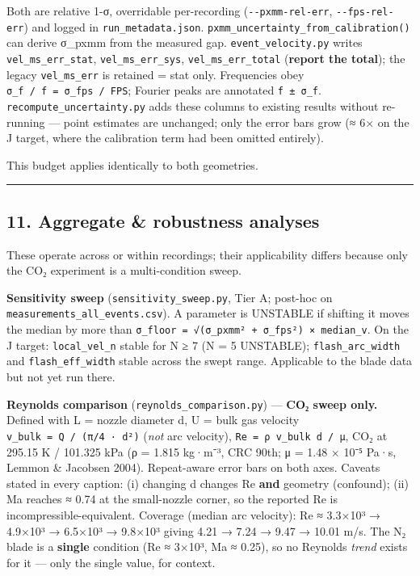 \documentclass[
  11pt,
]{article}
\begin{document}
Both are relative 1-σ, overridable per-recording
(\texttt{-\/-pxmm-rel-err}, \texttt{-\/-fps-rel-err}) and logged in
\texttt{run\_metadata.json}.
\texttt{pxmm\_uncertainty\_from\_calibration()} can derive σ\_pxmm from
the measured gap. \texttt{event\_velocity.py} writes
\texttt{vel\_ms\_err\_stat}, \texttt{vel\_ms\_err\_sys},
\texttt{vel\_ms\_err\_total} (\textbf{report the total}); the legacy
\texttt{vel\_ms\_err} is retained = stat only. Frequencies obey
\texttt{σ\_f\ /\ f\ =\ σ\_fps\ /\ FPS}; Fourier peaks are annotated
\texttt{f\ ±\ σ\_f}. \texttt{recompute\_uncertainty.py} adds these
columns to existing results without re-running --- point estimates are
unchanged; only the error bars grow (≈ 6× on the J target, where the
calibration term had been omitted entirely).

This budget applies identically to both geometries.

\begin{center}\rule{0.5\linewidth}{0.5pt}\end{center}

\hypertarget{11-aggregate--robustness-analyses}{%
\subsection{11. Aggregate \& robustness
analyses}\label{11-aggregate--robustness-analyses}}

These operate across or within recordings; their applicability differs
because only the CO₂ experiment is a multi-condition sweep.

\textbf{Sensitivity sweep} (\texttt{sensitivity\_sweep.py}, Tier A;
post-hoc on \texttt{measurements\_all\_events.csv}). A parameter is
UNSTABLE if shifting it moves the median by more than
\texttt{σ\_floor\ =\ √(σ\_pxmm²\ +\ σ\_fps²)\ ×\ median\_v}. On the J
target: \texttt{local\_vel\_n} stable for N ≥ 7 (N = 5 UNSTABLE);
\texttt{flash\_arc\_width} and \texttt{flash\_eff\_width} stable across
the swept range. Applicable to the blade data but not yet run there.

\textbf{Reynolds comparison} (\texttt{reynolds\_comparison.py}) ---
\textbf{CO₂ sweep only.} Defined with L = nozzle diameter d, U = bulk
gas velocity \texttt{v\_bulk\ =\ Q\ /\ (π/4\ ·\ d²)} (\emph{not} arc
velocity), \texttt{Re\ =\ ρ\ v\_bulk\ d\ /\ μ}, CO₂ at 295.15 K /
101.325 kPa (ρ = 1.815 kg·m⁻³, CRC 90th; μ = 1.48 × 10⁻⁵ Pa·s, Lemmon \&
Jacobsen 2004). Repeat-aware error bars on both axes. Caveats stated in
every caption: (i) changing d changes Re \textbf{and} geometry
(confound); (ii) Ma reaches ≈ 0.74 at the small-nozzle corner, so the
reported Re is incompressible-equivalent. Coverage (median arc
velocity): Re ≈ 3.3×10³ → 4.9×10³ → 6.5×10³ → 9.8×10³ giving 4.21 → 7.24
→ 9.47 → 10.01 m/s. The N₂ blade is a \textbf{single} condition (Re ≈
3×10³, Ma ≈ 0.25), so no Reynolds \emph{trend} exists for it --- only
the single value, for context.
\end{document}
